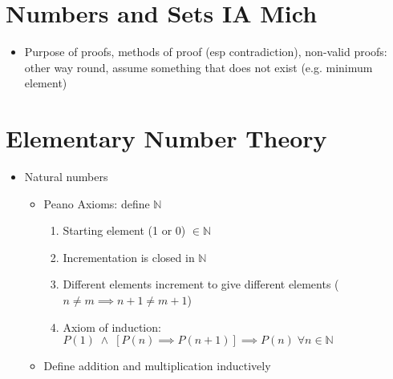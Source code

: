 



\section*{Numbers and Sets \hfill IA Mich}
\begin{itemize}
      \item Purpose of proofs, methods of proof (esp contradiction), non-valid proofs: other way round, assume something that does not exist (e.g. minimum element)
\end{itemize}

\section{Elementary Number Theory}
\begin{itemize}
      \item Natural numbers
            \begin{itemize}
                  \item Peano Axioms: define $\mathbb{N}$
                        \begin{enumerate}
                              \item Starting element (1 or 0) $\in \mathbb{N}$
                              \item Incrementation is closed in $\mathbb{N}$
                              \item Different elements increment to give different elements ($n \neq m \implies n+1 \neq m+1 $)
                              \item Axiom of induction: $P(1) \; \wedge \; \left[ P(n) \implies P(n+1) \right] \implies P(n) \; \forall n \in \mathbb{N}$
                        \end{enumerate}

                  \item Define addition and multiplication inductively
            \end{itemize}


\end{itemize}
